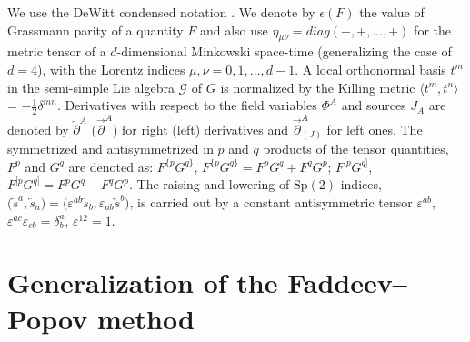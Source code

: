 \documentclass[10pt]{article}
\begin{document}
We use the DeWitt condensed notation \cite{DeWitt1}. We denote by $\epsilon (F)$
the  value of Grassmann parity  of a quantity $F$ and also
use $\eta_{\mu\nu} = diag (-,+,...,+)$ for the metric tensor of a $d$-dimensional Minkowski
space-time (generalizing the case of $d=4$), with the Lorentz indices $\mu, \nu = 0,1,...,d-1$.
A local orthonormal basis $t^m$ in the semi-simple Lie algebra $\mathcal{G}$ of $G$
is normalized by the Killing metric $\langle t^m,t^n\rangle$ = $-\frac{1}{2}\delta^{mn}$.
Derivatives with respect to the field variables $\Phi ^{A}$ and sources $J_{A}$ are denoted
by $\overleftarrow{\partial }^{A}$ ($\overrightarrow{\partial }^{A}$) for right (left) derivatives  and $\overrightarrow{\partial}_{(J)}^{A}$ for left ones. The symmetrized and antisymmetrized in $p$ and $q$ products of the tensor quantities, $F^{p}$ and $G^q$ are denoted as: $F^{\{p}G^{q\}}$, $F^{\{p}G^{q\}}= F^{p}G^{q}+F^{q}G^{p}$; $F^{[p}G^{q]}$, $F^{[p}G^{q]}=F^{p}G^{q}-F^{q}G^{p}$.
The raising and lowering of $\mathrm{Sp}\left( 2\right)$ indices,
$\big(\overleftarrow{s}^{a},\overleftarrow{s}_{a}\big)=\big(\varepsilon ^{ab}\overleftarrow{s}_{b},\varepsilon _{ab}\overleftarrow{s}^{b}\big)$,
is carried out by a constant antisymmetric tensor
$\varepsilon ^{ab}$, $\varepsilon ^{ac}\varepsilon _{cb}=\delta _{b}^{a}$, $\varepsilon ^{12}=1$.

\section{Generalization of the Faddeev--Popov method}
  \setcounter{equation}{0}
\end{document}
